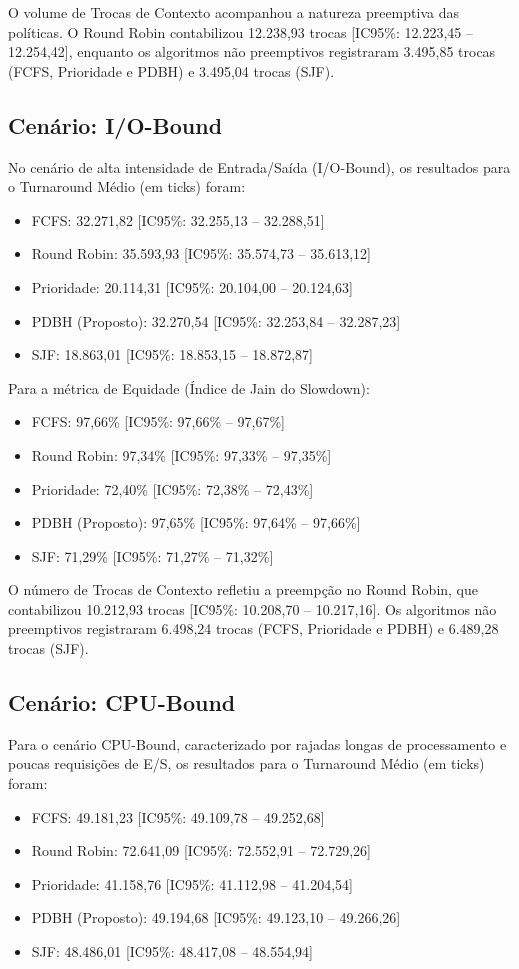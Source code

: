 \documentclass[conference]{IEEEtran}
\begin{document}
O volume de Trocas de Contexto acompanhou a natureza preemptiva das políticas. O Round Robin contabilizou 12.238,93 trocas [IC95\%: 12.223,45 -- 12.254,42], enquanto os algoritmos não preemptivos registraram 3.495,85 trocas (FCFS, Prioridade e PDBH) e 3.495,04 trocas (SJF).

\subsection{Cenário: I/O-Bound}
No cenário de alta intensidade de Entrada/Saída (I/O-Bound), os resultados para o Turnaround Médio (em ticks) foram:
\begin{itemize}
    \item FCFS: 32.271,82 [IC95\%: 32.255,13 -- 32.288,51]
    \item Round Robin: 35.593,93 [IC95\%: 35.574,73 -- 35.613,12]
    \item Prioridade: 20.114,31 [IC95\%: 20.104,00 -- 20.124,63]
    \item PDBH (Proposto): 32.270,54 [IC95\%: 32.253,84 -- 32.287,23]
    \item SJF: 18.863,01 [IC95\%: 18.853,15 -- 18.872,87]
\end{itemize}

Para a métrica de Equidade (Índice de Jain do Slowdown):
\begin{itemize}
    \item FCFS: 97,66\% [IC95\%: 97,66\% -- 97,67\%]
    \item Round Robin: 97,34\% [IC95\%: 97,33\% -- 97,35\%]
    \item Prioridade: 72,40\% [IC95\%: 72,38\% -- 72,43\%]
    \item PDBH (Proposto): 97,65\% [IC95\%: 97,64\% -- 97,66\%]
    \item SJF: 71,29\% [IC95\%: 71,27\% -- 71,32\%]
\end{itemize}

O número de Trocas de Contexto refletiu a preempção no Round Robin, que contabilizou 10.212,93 trocas [IC95\%: 10.208,70 -- 10.217,16]. Os algoritmos não preemptivos registraram 6.498,24 trocas (FCFS, Prioridade e PDBH) e 6.489,28 trocas (SJF).

\subsection{Cenário: CPU-Bound}
Para o cenário CPU-Bound, caracterizado por rajadas longas de processamento e poucas requisições de E/S, os resultados para o Turnaround Médio (em ticks) foram:
\begin{itemize}
    \item FCFS: 49.181,23 [IC95\%: 49.109,78 -- 49.252,68]
    \item Round Robin: 72.641,09 [IC95\%: 72.552,91 -- 72.729,26]
    \item Prioridade: 41.158,76 [IC95\%: 41.112,98 -- 41.204,54]
    \item PDBH (Proposto): 49.194,68 [IC95\%: 49.123,10 -- 49.266,26]
    \item SJF: 48.486,01 [IC95\%: 48.417,08 -- 48.554,94]
\end{itemize}
\end{document}
